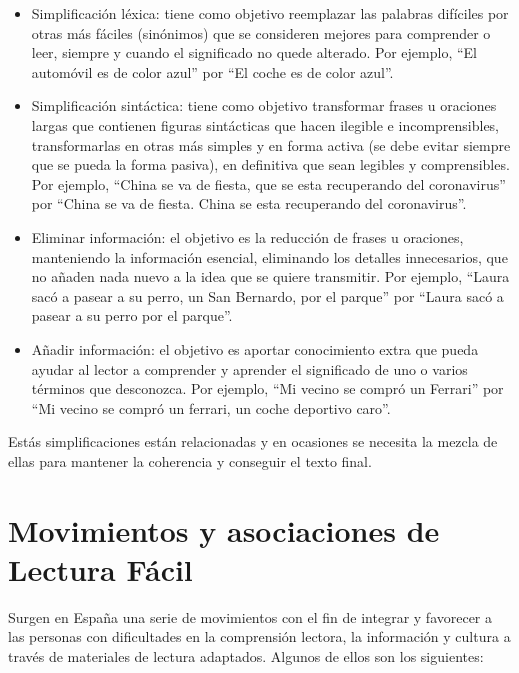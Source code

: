  \begin{itemize}
	
	\item Simplificación léxica: tiene como objetivo reemplazar las palabras difíciles por otras más fáciles (sinónimos) que se consideren mejores para comprender o leer, siempre y cuando el significado no quede alterado. Por ejemplo, ``El automóvil es de color azul'' por ``El coche es de color azul''.
	
	\item Simplificación sintáctica: tiene como objetivo transformar frases u oraciones largas que contienen figuras sintácticas que hacen ilegible e incomprensibles, transformarlas en otras más simples y en forma activa (se debe evitar siempre que se pueda la forma pasiva), en definitiva que sean legibles y comprensibles. Por ejemplo, ``China se va de fiesta, que se esta recuperando del coronavirus'' por ``China se va de fiesta. China se esta recuperando del coronavirus''. 
	
	\item Eliminar información: el objetivo es la reducción de frases u oraciones, manteniendo la información esencial, eliminando los detalles innecesarios, que no añaden nada nuevo a la idea que se quiere transmitir. Por ejemplo, ``Laura sacó a pasear a su perro, un San Bernardo, por el parque'' por ``Laura sacó a pasear a su perro por el parque''. 
	
	\item Añadir información: el objetivo es aportar conocimiento extra que pueda ayudar al lector a comprender y aprender el significado de uno o varios términos que desconozca. Por ejemplo, ``Mi vecino se compró un Ferrari'' por ``Mi vecino se compró un ferrari, un coche deportivo caro''. 
	
\end{itemize}


 Estás simplificaciones están relacionadas y en ocasiones se necesita la mezcla de ellas para mantener la coherencia y conseguir el texto final.




\section{Movimientos y asociaciones de Lectura Fácil}
Surgen en España una serie de movimientos con el fin de integrar y favorecer a las personas con dificultades en la comprensión lectora, la información y cultura a través de materiales de lectura adaptados. Algunos de ellos son los siguientes:



